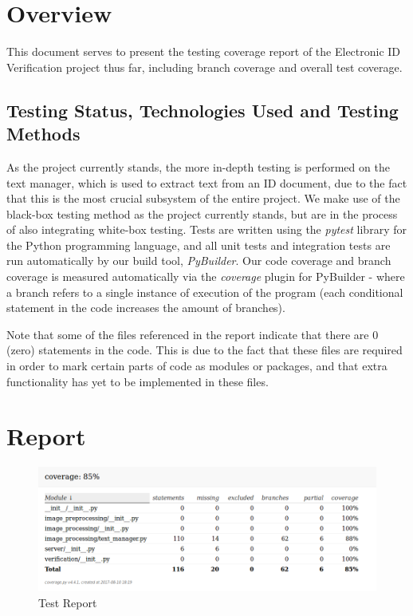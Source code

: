 \documentclass{article}
\def \project{Electronic ID Verification }
\begin{document}
\cleardoublepage
\thispagestyle{empty}
\tableofcontents
\newpage

\setcounter{page}{1}
	\section{Overview}\label{sec:intro}
		This document serves to present the testing coverage report of the \project project thus far, including branch coverage and overall test coverage.
		\subsection{Testing Status, Technologies Used and Testing Methods}
		As the project currently stands, the more in-depth testing is performed on the text manager, which is used to extract text from an ID document, due to the fact that this is the most crucial subsystem of the entire project. We make use of the black-box testing method as the project currently stands, but are in the process of also integrating white-box testing. Tests are written using the \textit{pytest} library for the Python programming language, and all unit tests and integration tests are run automatically by our build tool, \textit{PyBuilder}. Our code coverage and branch coverage is measured automatically via the \textit{coverage} plugin for PyBuilder - where a branch refers to a single instance of execution of the program (each conditional statement in the code increases the amount of branches).
		
		Note that some of the files referenced in the report indicate that there are 0 (zero) statements in the code. This is due to the fact that these files are required in order to mark certain parts of code as modules or packages, and that extra functionality has yet to be implemented in these files.
	\section{Report}
	\begin{figure}[h]
		\includegraphics[scale=0.5]{img/coverage.png}
		\caption{Test Report}
	\end{figure}
\end{document}

